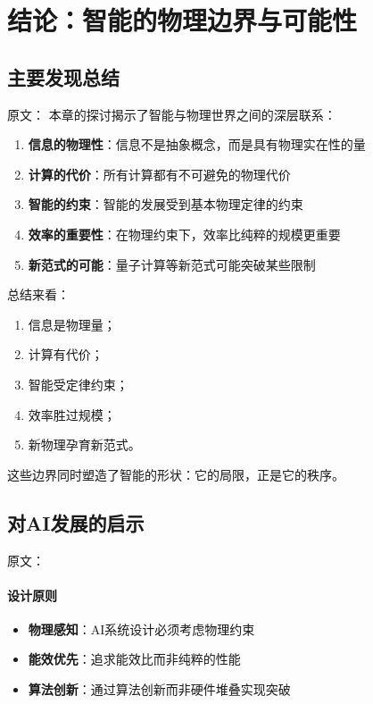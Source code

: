 \section{结论：智能的物理边界与可能性}

\subsection{主要发现总结}

原文：
本章的探讨揭示了智能与物理世界之间的深层联系：
\begin{enumerate}
\item \textbf{信息的物理性}：信息不是抽象概念，而是具有物理实在性的量
\item \textbf{计算的代价}：所有计算都有不可避免的物理代价
\item \textbf{智能的约束}：智能的发展受到基本物理定律的约束
\item \textbf{效率的重要性}：在物理约束下，效率比纯粹的规模更重要
\item \textbf{新范式的可能}：量子计算等新范式可能突破某些限制
\end{enumerate}
总结来看：
\begin{enumerate}
\item 信息是物理量；
\item 计算有代价；
\item 智能受定律约束；
\item 效率胜过规模；
\item 新物理孕育新范式。
\end{enumerate}
这些边界同时塑造了智能的形状：它的局限，正是它的秩序。

\subsection{对AI发展的启示}

原文：
\paragraph{设计原则}
\begin{itemize}
\item \textbf{物理感知}：AI系统设计必须考虑物理约束
\item \textbf{能效优先}：追求能效比而非纯粹的性能
\item \textbf{算法创新}：通过算法创新而非硬件堆叠实现突破
\end{itemize}
